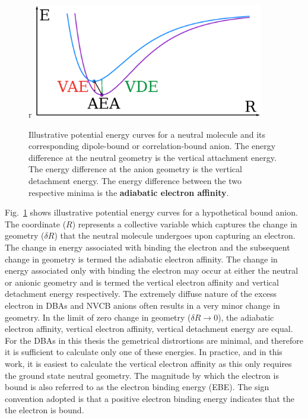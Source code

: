 \begin{figure}{r}
	\centering
	\includegraphics[width=0.9\textwidth,keepaspectratio]{Images/chapter1/morse.eps}
	\caption{Illustrative potential energy curves for a neutral molecule and its corresponding dipole-bound or correlation-bound anion. The energy difference at the neutral geometry is the vertical attachment energy. The energy difference at the anion geometry is the vertical detachment energy. The energy difference between the two respective minima is the \textbf{adiabatic electron affinity}.}
	\label{fig:morse}
\end{figure}

Fig.~\ref{fig:morse} shows illustrative potential energy curves for a hypothetical bound anion.
The coordinate ($R$) represents a collective variable which captures the change in geometry ($\delta R$) that the neutral molecule undergoes upon capturing an electron.
The change in energy associated with binding the electron and the subsequent change in geometry is termed the adiabatic electron affinity.
The change in energy associated only with binding the electron may occur at either the neutral or anionic geometry and is termed the vertical electron affinity and vertical detachment energy respectively.
The extremely diffuse nature of the excess electron in DBAs and NVCB anions often results in a very minor change in geometry.
In the limit of zero change in geometry ($\delta R \rightarrow 0$), the adiabatic electron affinity, vertical electron affinity, vertical detachment energy are equal.
For the DBAs in this thesis the gemetrical distrortions are minimal, and therefore it is sufficient to calculate only one of these energies.
In practice, and in this work, it is easiest to calculate the vertical electron affinity as this only requires the ground state neutral geometry.
The magnitude by which the electron is bound is also referred to as the electron binding energy (EBE).
The sign convention adopted is that a positive electron binding energy indicates that the the electron is bound.
